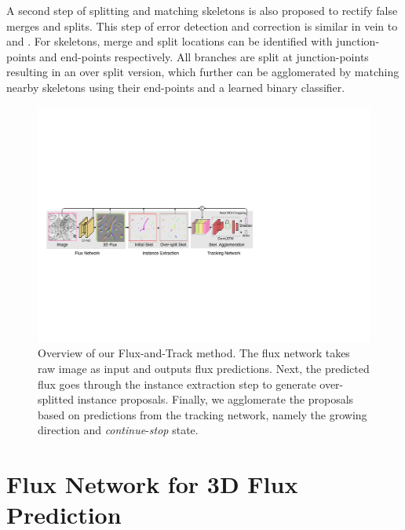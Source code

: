 A second step of splitting and matching skeletons is also proposed to rectify false merges and splits. This step of error detection and correction is similar in vein to \cite{Brain2019} and \cite{Seung2017}.
For skeletons, merge and split locations can be identified with junction-points and end-points respectively. All branches are split at junction-points resulting in an over split version, which further can be agglomerated by matching nearby skeletons using their end-points and a learned binary classifier.

\begin{figure}[t]
	\centering
	\includegraphics[width=\textwidth]{figures/model/architecture_0313.pdf}
	\caption{Overview of our Flux-and-Track method. The flux network takes raw image as input and outputs flux predictions. Next, the predicted flux goes through the instance extraction step to generate over-splitted instance proposals. Finally, we agglomerate the proposals based on predictions from the tracking network, namely the growing direction and \textit{continue}-\textit{stop} state. 
	}
	
	\label{fig:method_overview}
\end{figure}

\section{Flux Network for 3D Flux Prediction}

